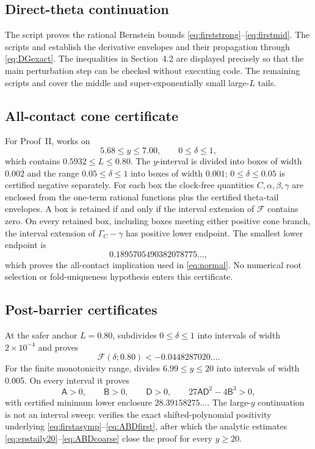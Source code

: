 \documentclass{amsart}
\numberwithin{equation}{section}
\theoremstyle{definition}
\theoremstyle{remark}
\newcommand{\Fcal}{\mathcal F}
\begin{document}
\subsection{Direct-theta continuation}
The script  proves the rational Bernstein bounds \eqref{eq:firststrong}--\eqref{eq:firstmid}.  The scripts  and  establish the derivative envelopes and their propagation through \eqref{eq:DGexact}.  The inequalities in Section~4.2 are displayed precisely so that the main perturbation step can be checked without executing code.  The remaining scripts  and  cover the middle and super-exponentially small large-$L$ tails.

\subsection{All-contact cone certificate}
For Proof~II,  works on
\[
 5.68\le y\le7.00,
 \qquad 0\le\delta\le1,
\]
which contains $0.5932\le L\le0.80$.  The $y$-interval is divided into boxes of width $0.002$ and the range $0.05\le\delta\le1$ into boxes of width $0.001$; $0\le\delta\le0.05$ is certified negative separately.  For each box the clock-free quantities $C,\alpha,\beta,\gamma$ are enclosed from the one-term rational functions plus the certified theta-tail envelopes.  A box is retained if and only if the interval extension of $\Fcal$ contains zero.  On every retained box, including boxes meeting either positive cone branch, the interval extension of $\Gamma_C-\gamma$ has positive lower endpoint.  The smallest lower endpoint is
\[
 0.1895705490382078775\ldots,
\]
which proves the all-contact implication used in \eqref{eq:normal}.  No numerical root selection or fold-uniqueness hypothesis enters this certificate.

\subsection{Post-barrier certificates}
At the safer anchor $L=0.80$,  subdivides $0\le\delta\le1$ into intervals of width $2\times10^{-4}$ and proves
\[
 \Fcal(\delta;0.80)<-0.0448287020\ldots.
\]
For the finite monotonicity range,  divides $6.99\le y\le20$ into intervals of width $0.005$.  On every interval it proves
\[
 \mathsf A>0,\qquad \mathsf B>0,\qquad \mathsf D>0,
 \qquad 27\mathsf A\mathsf D^2-4\mathsf B^3>0,
\]
with certified minimum lower enclosure $28.39158275\ldots$.  The large-$y$ continuation is not an interval sweep:  verifies the exact shifted-polynomial positivity underlying \eqref{eq:firstasymp}--\eqref{eq:ABDfirst}, after which the analytic estimates \eqref{eq:epstaily20}--\eqref{eq:ABDcoarse} close the proof for every $y\ge20$.
\end{document}
